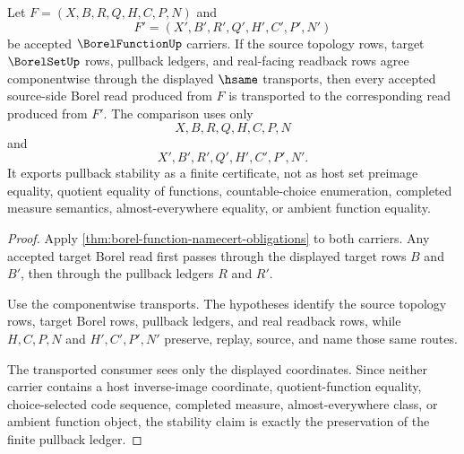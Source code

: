 \begin{theorem}
\label{thm:borel-function-pullback-stability}
Let $F=(X,B,R,Q,H,C,P,N)$ and
$$
F'=(X',B',R',Q',H',C',P',N')
$$
be accepted $\BorelFunctionUp$ carriers. If the source topology rows, target $\BorelSetUp$ rows, pullback ledgers, and real-facing readback rows agree componentwise through the displayed $\hsame$ transports, then every accepted source-side Borel read produced from $F$ is transported to the corresponding read produced from $F'$. The comparison uses only
$$
X,B,R,Q,H,C,P,N
$$
and
$$
X',B',R',Q',H',C',P',N' .
$$
It exports pullback stability as a finite certificate, not as host set preimage equality, quotient equality of functions, countable-choice enumeration, completed measure semantics, almost-everywhere equality, or ambient function equality.
\end{theorem}
\begin{proof}
Apply \autoref{thm:borel-function-namecert-obligations} to both carriers. Any accepted target Borel read first passes through the displayed target rows $B$ and $B'$, then through the pullback ledgers $R$ and $R'$.

Use the componentwise transports. The hypotheses identify the source topology rows, target Borel rows, pullback ledgers, and real readback rows, while $H,C,P,N$ and $H',C',P',N'$ preserve, replay, source, and name those same routes.

The transported consumer sees only the displayed coordinates. Since neither carrier contains a host inverse-image coordinate, quotient-function equality, choice-selected code sequence, completed measure, almost-everywhere class, or ambient function object, the stability claim is exactly the preservation of the finite pullback ledger.
\end{proof}



